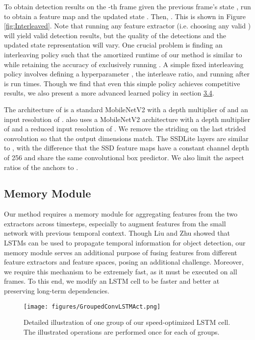 \documentclass[10pt,twocolumn,letterpaper]{article}
\begin{document}
To obtain detection results  on the -th frame given the previous frame's state , run  to obtain a feature map  and the updated state . Then, . This is shown in Figure \ref{fig:Interleaved}. Note that running any feature extractor (i.e. choosing any valid ) will yield valid detection results, but the quality of the detections and the updated state representation will vary. One crucial problem is finding an interleaving policy such that the amortized runtime of our method is similar to  while retaining the accuracy of exclusively running . A simple fixed interleaving policy involves defining a hyperparameter , the interleave ratio, and running  after  is run  times. Though we find that even this simple policy achieves competitive results, we also present a more advanced learned policy in section \hyperref[sec:3.4]{3.4}.

The architecture of  is a standard MobileNetV2 \cite{sandler2018mobilenetv2} with a depth multiplier of  and an input resolution of .  also uses a MobileNetV2 architecture with a depth multiplier of  and a reduced input resolution of . We remove the striding on the last strided convolution so that the output dimensions match. The SSDLite layers are similar to \cite{sandler2018mobilenetv2}, with the difference that the SSD feature maps have a constant channel depth of 256 and share the same convolutional box predictor. We also limit the aspect ratios of the anchors to .


\subsection{Memory Module}\label{sec:3.2}
Our method requires a memory module for aggregating features from the two extractors across timesteps, especially to augment features from the small network with previous temporal context. Though Liu and Zhu \cite{liu2018mobile} showed that LSTMs can be used to propagate temporal information for object detection, our memory module serves an additional purpose of fusing features from different feature extractors and feature spaces, posing an additional challenge. Moreover, we require this mechanism to be extremely fast, as it must be executed on all frames. To this end, we modify an LSTM cell to be faster and better at preserving long-term dependencies.

\begin{figure}[ht]
\begin{center}
  \texttt{[image: figures/GroupedConvLSTMAct.png]}
\vspace{-2em}
\end{center}
  \caption{Detailed illustration of one group of our speed-optimized LSTM cell. The illustrated operations are performed once for each of  groups.}
\label{fig:fast-lstm}
\end{figure}
\end{document}
